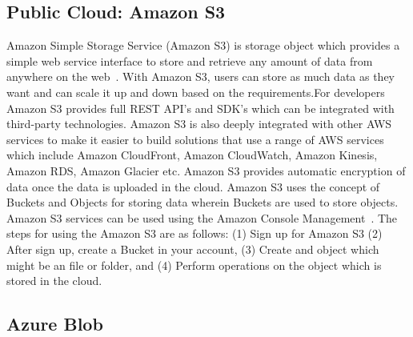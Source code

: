      \pv
     
\subsection{Public Cloud: Amazon S3}

Amazon Simple Storage Service (Amazon S3) is storage object which
provides a simple web service interface to store and retrieve any
amount of data from anywhere on the web~\cite{www-amazon-s3}. With
Amazon S3, users can store as much data as they want and can scale it
up and down based on the requirements.For developers Amazon S3
provides full REST API's and SDK's which can be integrated with
third-party technologies. Amazon S3 is also deeply integrated with
other AWS services to make it easier to build solutions that use a
range of AWS services which include Amazon CloudFront, Amazon
CloudWatch, Amazon Kinesis, Amazon RDS, Amazon Glacier etc. Amazon S3
provides automatic encryption of data once the data is uploaded in the
cloud. Amazon S3 uses the concept of Buckets and Objects for storing
data wherein Buckets are used to store objects. Amazon S3 services can
be used using the Amazon Console
Management~\cite{www-amazon-s3-docs}. The steps for using the Amazon
S3 are as follows: (1) Sign up for Amazon S3 (2) After sign up, create
a Bucket in your account, (3) Create and object which might be an file
or folder, and (4) Perform operations on the object which is stored in
the cloud.

     \pv

	
\subsection{Azure Blob}

